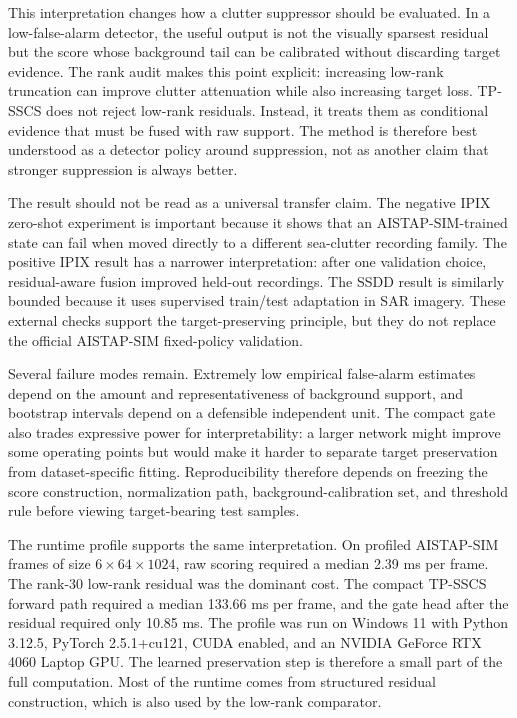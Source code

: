 \documentclass[journal]{IEEEtran}
\begin{document}
This interpretation changes how a clutter suppressor should be evaluated. In a low-false-alarm detector, the useful output is not the visually sparsest residual but the score whose background tail can be calibrated without discarding target evidence. The rank audit makes this point explicit: increasing low-rank truncation can improve clutter attenuation while also increasing target loss. TP-SSCS does not reject low-rank residuals. Instead, it treats them as conditional evidence that must be fused with raw support. The method is therefore best understood as a detector policy around suppression, not as another claim that stronger suppression is always better.

The result should not be read as a universal transfer claim. The negative IPIX zero-shot experiment is important because it shows that an AISTAP-SIM-trained state can fail when moved directly to a different sea-clutter recording family. The positive IPIX result has a narrower interpretation: after one validation choice, residual-aware fusion improved held-out recordings. The SSDD result is similarly bounded because it uses supervised train/test adaptation in SAR imagery. These external checks support the target-preserving principle, but they do not replace the official AISTAP-SIM fixed-policy validation.

Several failure modes remain. Extremely low empirical false-alarm estimates depend on the amount and representativeness of background support, and bootstrap intervals depend on a defensible independent unit. The compact gate also trades expressive power for interpretability: a larger network might improve some operating points but would make it harder to separate target preservation from dataset-specific fitting. Reproducibility therefore depends on freezing the score construction, normalization path, background-calibration set, and threshold rule before viewing target-bearing test samples.

The runtime profile supports the same interpretation. On profiled AISTAP-SIM frames of size $6\times64\times1024$, raw scoring required a median 2.39 ms per frame. The rank-30 low-rank residual was the dominant cost. The compact TP-SSCS forward path required a median 133.66 ms per frame, and the gate head after the residual required only 10.85 ms. The profile was run on Windows 11 with Python 3.12.5, PyTorch 2.5.1+cu121, CUDA enabled, and an NVIDIA GeForce RTX 4060 Laptop GPU. The learned preservation step is therefore a small part of the full computation. Most of the runtime comes from structured residual construction, which is also used by the low-rank comparator.
\end{document}
